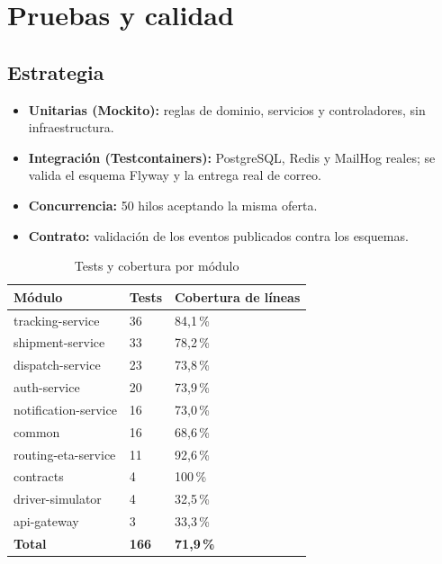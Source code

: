 \documentclass[10pt,letterpaper,twocolumn,oneside]{report}
\begin{document}
\chapter{Pruebas y calidad}

\section{Estrategia}

\begin{itemize}[leftmargin=1.2cm]
  \item \textbf{Unitarias (Mockito):} reglas de dominio, servicios y controladores, sin
        infraestructura.
  \item \textbf{Integración (Testcontainers):} PostgreSQL, Redis y MailHog reales; se valida el
        esquema Flyway y la entrega real de correo.
  \item \textbf{Concurrencia:} 50 hilos aceptando la misma oferta.
  \item \textbf{Contrato:} validación de los eventos publicados contra los esquemas.
\end{itemize}

\begin{table}[t]
\centering
\caption{Tests y cobertura por módulo}
\small
\begin{tabular}{@{}L{4.6cm}C{2cm}C{2.6cm}@{}}
\toprule
\textbf{Módulo} & \textbf{Tests} & \textbf{Cobertura de líneas}\\
\midrule
tracking-service & 36 & 84,1\,\%\\
shipment-service & 33 & 78,2\,\%\\
dispatch-service & 23 & 73,8\,\%\\
auth-service & 20 & 73,9\,\%\\
notification-service & 16 & 73,0\,\%\\
common & 16 & 68,6\,\%\\
routing-eta-service & 11 & 92,6\,\%\\
contracts & 4 & 100\,\%\\
driver-simulator & 4 & 32,5\,\%\\
api-gateway & 3 & 33,3\,\%\\
\midrule
\textbf{Total} & \textbf{166} & \textbf{71,9\,\%}\\
\bottomrule
\end{tabular}
\end{table}
\end{document}
